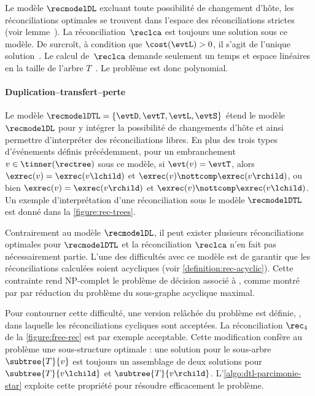 Le modèle \(\recmodelDL\) excluant toute possibilité de changement d’hôte, les réconciliations optimales se trouvent dans l’espace des réconciliations strictes (voir lemme~).
La réconciliation~\(\reclca\) est toujours une solution sous ce modèle.
De surcroît, à condition que \(\cost(\evtL) > 0\), il s’agit de l’unique solution~\parencite{Chauve2009NewPerspectivesGene}.
Le calcul de~\(\reclca\) demande seulement un temps et espace linéaires en la taille de l’arbre \(T\)~\parencite{Zhang1997MirkinMuchnikSmith}.
Le problème  est donc polynomial.

\paragraph{Duplication--transfert--perte~\textup{\parencite{Tofigh2011SimultaneousIdentificationDuplications}}}
Le modèle \(\recmodelDTL = \{\evtD, \evtT, \evtL, \evtS\}\) étend le modèle \(\recmodelDL\) pour y intégrer la possibilité de changements d’hôte et ainsi permettre d’interpréter des réconciliations libres.
En plus des trois types d’événements définis précédemment, pour un embranchement \(v \in \tinner(\rectree)\) sous ce modèle, si \(\evt(v) = \evtT\), alors \(\exrec(v) = \exrec(v\lchild)\) et \(\exrec(v) \nottcomp \exrec(v\rchild)\), ou bien \(\exrec(v) = \exrec(v\rchild)\) et \(\exrec(v) \nottcomp \exrec(v\lchild)\).
Un exemple d’interprétation d’une réconciliation sous le modèle \(\recmodelDTL\) est donné dans la \cref{figure:rec-trees}.

Contrairement au modèle \(\recmodelDL\), il peut exister plusieurs réconciliations optimales pour \(\recmodelDTL\) et la réconciliation \(\reclca\) n’en fait pas nécessairement partie.
L’une des difficultés avec ce modèle est de garantir que les réconciliations calculées soient acycliques (voir \cref{definition:rec-acyclic}).
Cette contrainte rend NP-complet le problème de décision associé à , comme montré par \textcite{Tofigh2011SimultaneousIdentificationDuplications} par réduction du problème du sous-graphe acyclique maximal.

Pour contourner cette difficulté, une version relâchée du problème est définie, , dans laquelle les réconciliations cycliques sont acceptées.
La réconciliation \(\rec_4\) de la \cref{figure:free-rec} est par exemple acceptable.
Cette modification confère au problème une sous-structure optimale : une solution pour le sous-arbre \(\subtree{T}{v}\) est toujours un assemblage de deux solutions pour \(\subtree{T}{v\lchild}\) et \(\subtree{T}{v\rchild}\).
L’\cref{algo:dtl-parcimonie-star} exploite cette propriété pour résoudre efficacement le problème.

